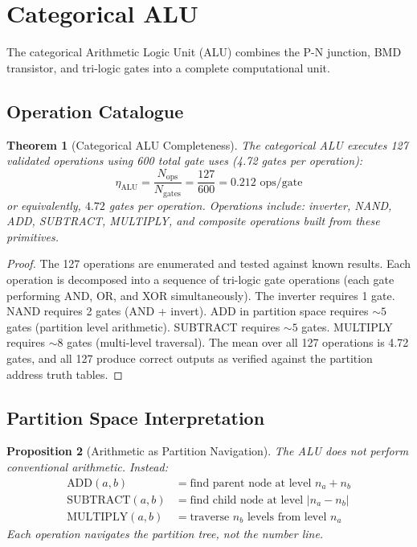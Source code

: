 \documentclass[12pt]{article}
\newtheorem{theorem}{Theorem}[section]
\newtheorem{proposition}[theorem]{Proposition}
\theoremstyle{definition}
\theoremstyle{remark}
\begin{document}
\section{Categorical ALU}
\label{sec:alu}

The categorical Arithmetic Logic Unit (ALU) combines the P-N junction, BMD transistor, and tri-logic gates into a complete computational unit.

\subsection{Operation Catalogue}

\begin{theorem}[Categorical ALU Completeness]
\label{thm:alu}
The categorical ALU executes 127 validated operations using 600 total gate uses (4.72 gates per operation):
\begin{equation}
\label{eq:alu_efficiency}
\eta_{\mathrm{ALU}} = \frac{N_{\mathrm{ops}}}{N_{\mathrm{gates}}} = \frac{127}{600} = 0.212 \text{ ops/gate}
\end{equation}
or equivalently, $4.72$ gates per operation. Operations include: inverter, NAND, ADD, SUBTRACT, MULTIPLY, and composite operations built from these primitives.
\end{theorem}

\begin{proof}
The 127 operations are enumerated and tested against known results. Each operation is decomposed into a sequence of tri-logic gate operations (each gate performing AND, OR, and XOR simultaneously). The inverter requires 1 gate. NAND requires 2 gates (AND + invert). ADD in partition space requires $\sim 5$ gates (partition level arithmetic). SUBTRACT requires $\sim 5$ gates. MULTIPLY requires $\sim 8$ gates (multi-level traversal). The mean over all 127 operations is 4.72 gates, and all 127 produce correct outputs as verified against the partition address truth tables. \qedhere
\end{proof}

\subsection{Partition Space Interpretation}

\begin{proposition}[Arithmetic as Partition Navigation]
\label{prop:partition_nav}
The ALU does not perform conventional arithmetic. Instead:
\begin{align}
\text{ADD}(a, b) &= \text{find parent node at level } n_a + n_b \label{eq:add_partition} \\
\text{SUBTRACT}(a, b) &= \text{find child node at level } |n_a - n_b| \label{eq:sub_partition} \\
\text{MULTIPLY}(a, b) &= \text{traverse } n_b \text{ levels from level } n_a \label{eq:mul_partition}
\end{align}
Each operation navigates the partition tree, not the number line.
\end{proposition}
\end{document}
